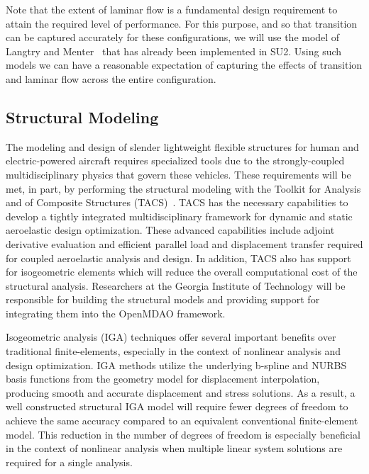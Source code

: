 \documentclass[]{aiaa-tc}
\begin{document}
    Note that the extent of laminar flow is a fundamental design requirement to attain the required level of performance.  For this purpose, and so that transition can be captured accurately for these configurations, we will use the model of Langtry and Menter~\cite{Langtry:Correlation} that has already been implemented in SU2.  Using such models we can have a reasonable expectation of capturing the effects of transition and laminar flow across the entire configuration.          

 
    
        \subsection{Structural Modeling}

The modeling and design of slender lightweight flexible structures for
human and electric-powered aircraft requires specialized tools due to
the strongly-coupled multidisciplinary physics that govern these
vehicles. These requirements will be met, in part, by performing the
structural modeling with the Toolkit for Analysis and of Composite
Structures (TACS)~\cite{Kennedy:2014:TACS,
  Kennedy:2014:tacs-tripan}. TACS has the necessary capabilities to
develop a tightly integrated multidisciplinary framework for dynamic
and static aeroelastic design optimization. These advanced
capabilities include adjoint derivative evaluation and efficient
parallel load and displacement transfer required for coupled
aeroelastic analysis and design.  In addition, TACS also has support
for isogeometric elements which will reduce the overall computational
cost of the structural analysis. Researchers at the Georgia Institute
of Technology will be responsible for building the structural models
and providing support for integrating them into the OpenMDAO
framework.

Isogeometric analysis (IGA) techniques offer several important
benefits over traditional finite-elements, especially in the context
of nonlinear analysis and design optimization. IGA methods utilize the
underlying b-spline and NURBS basis functions from the geometry model
for displacement interpolation, producing smooth and accurate
displacement and stress solutions. As a result, a well constructed
structural IGA model will require fewer degrees of freedom to achieve
the same accuracy compared to an equivalent conventional
finite-element model. This reduction in the number of degrees of
freedom is especially beneficial in the context of nonlinear analysis
when multiple linear system solutions are required for a single
analysis. 
\end{document}
